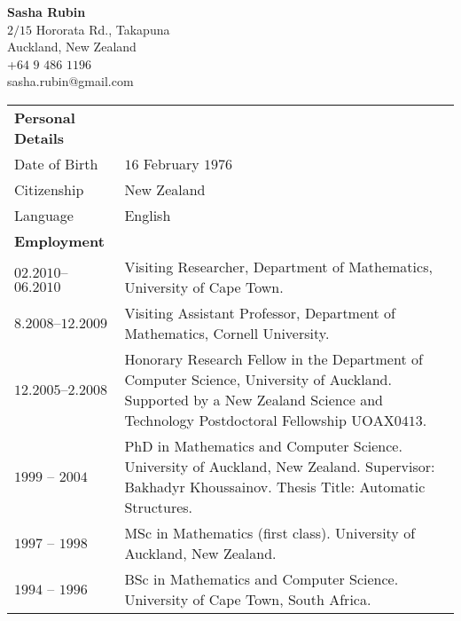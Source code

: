 \documentclass{article}
\theoremstyle{plain} \numberwithin{equation}{section}
\theoremstyle{definition}
\def\tit#1{\bf{#1}}
\begin{document}

 \begin{flushright}
{\bf  Sasha Rubin}\\
 $2/15$ Hororata Rd., Takapuna \\
  		  Auckland, New Zealand\\
     +$64$ $9$ $486$ $1196$\\
      sasha.rubin@gmail.com\\
 \end{flushright}

\begin{tabular}{p{1.3in}p{3.5in}}



{\tit Personal Details} &\\
Date of Birth 		& $16$ February $1976$\\
Citizenship		& New Zealand \\
Language			& English\\

\vspace{2pt}

{\tit Employment} &\\

$02.2010$--$06.2010$ & Visiting Researcher, Department of Mathematics, University of Cape Town.\\

$8.2008$--$12.2009$ & Visiting Assistant Professor, Department of Mathematics,
Cornell University. \\

$12.2005$--$2.2008$ & Honorary Research Fellow in the Department of Computer
Science, University of Auckland. Supported by a New Zealand Science and Technology Postdoctoral
Fellowship $\textrm{UOAX}0413$.\\

$1999$ -- $2004$ & PhD in Mathematics and Computer Science.
University of Auckland, New Zealand.
Supervisor: Bakhadyr Khoussainov.
Thesis Title: Automatic Structures.\\

$1997$ -- $1998$ & MSc in Mathematics (first class). University of Auckland, New Zealand.\\

$1994$ -- $1996$ & BSc in Mathematics and Computer Science. University of Cape Town, South Africa.\\

\end{tabular}
\end{document}
